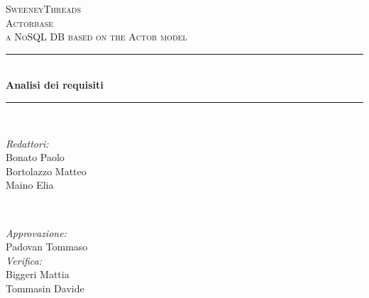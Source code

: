 \documentclass[a4paper]{report}
\begin{document}
	
	\begin{titlepage}
		\newcommand{\HRule}{\rule{\linewidth}{0.5mm}} 
		\center  
		
		\textsc{\LARGE SweeneyThreads}\\[1.5cm] 
		\textsc{\Large Actorbase}\\[0.5cm] 
		\textsc{\large a NoSQL DB based on the Actor model}\\[0.5cm]
		
		
		\HRule \\[0.4cm]
		{ \huge \bfseries Analisi dei requisiti}\\[0.4cm] 
		\HRule \\[1.5cm]
		
		\begin{minipage}{0.4\textwidth}
			\begin{flushleft} \large
				\emph{Redattori:}\\
				Bonato Paolo \\
				Bortolazzo Matteo \\
				Maino Elia
			\end{flushleft}
		\end{minipage}
		~
		\begin{minipage}{0.4\textwidth}
			\begin{flushright} \large
				\emph{Approvazione:} \\
				Padovan Tommaso \\
				\emph{Verifica:} \\
				Biggeri Mattia \\
				Tommasin Davide 
			\end{flushright}
		\end{minipage}
		

\end{titlepage}
\end{document}
